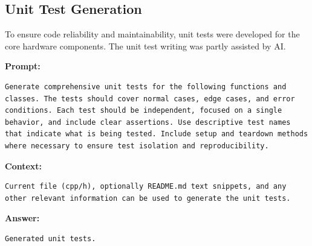 \subsection*{Unit Test Generation}

To ensure code reliability and maintainability, unit tests were developed for the core hardware components.
The unit test writing was partly assisted by AI.


\textbf{Prompt:}
\begin{lstlisting}[language={}, breaklines=true]
Generate comprehensive unit tests for the following functions and classes. The tests should cover normal cases, edge cases, and error conditions. Each test should be independent, focused on a single behavior, and include clear assertions. Use descriptive test names that indicate what is being tested. Include setup and teardown methods where necessary to ensure test isolation and reproducibility.
\end{lstlisting}

\textbf{Context:}
\begin{lstlisting}[language={}, breaklines=true]
Current file (cpp/h), optionally README.md text snippets, and any other relevant information can be used to generate the unit tests.
\end{lstlisting}

\textbf{Answer:}
\begin{lstlisting}[language={}, breaklines=true]
Generated unit tests.
\end{lstlisting}
